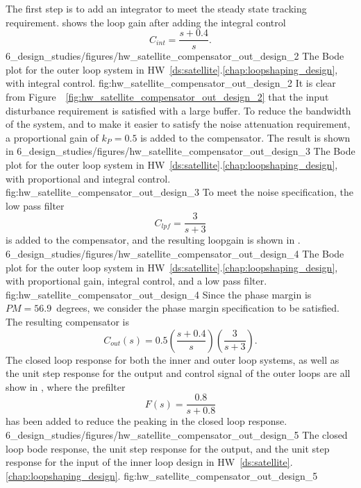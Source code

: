 The first step is to add an integrator to meet the steady state tracking requirement.   shows the loop gain after adding the integral control
\[
C_{int} = \frac{s+0.4}{s}.
\]
	{6_design_studies/figures/hw_satellite_compensator_out_design_2}
   	{The Bode plot for the outer loop system in HW~\ref{ds:satellite}.\ref{chap:loopshaping_design}, with integral control.}
   	{fig:hw_satellite_compensator_out_design_2}
It is clear from Figure~~\ref{fig:hw_satellite_compensator_out_design_2} that the input disturbance requirement is satisfied with a large buffer.  To reduce the bandwidth of the system, and to make it easier to satisfy the noise attenuation requirement, a proportional gain of $k_P=0.5$ is added to the compensator.  The result is shown in 
	{6_design_studies/figures/hw_satellite_compensator_out_design_3}
   	{The Bode plot for the outer loop system in HW~\ref{ds:satellite}.\ref{chap:loopshaping_design}, with proportional and integral control.}
   	{fig:hw_satellite_compensator_out_design_3}
To meet the noise specification, the low pass filter
\[
C_{lpf} = \frac{3}{s+3}
\]
is added to the compensator, and the resulting loopgain is shown in .
	{6_design_studies/figures/hw_satellite_compensator_out_design_4}
   	{The Bode plot for the outer loop system in HW~\ref{ds:satellite}.\ref{chap:loopshaping_design}, with proportional gain, integral control, and a low pass  filter.}
   	{fig:hw_satellite_compensator_out_design_4}
Since the phase margin is $PM=56.9$~degrees, we consider the phase margin specification to be satisfied.
The resulting compensator is
\[
C_{out}(s) = 0.5\left(\frac{s+0.4}{s}\right)\left(\frac{3}{s+3}\right).
\]
The closed loop response for both the inner and outer loop systems, 
as well as the unit step response for the output and control signal of the outer loops are all show in , where the prefilter
\[
F(s) = \frac{0.8}{s+0.8}
\]
has been added to reduce the peaking in the closed loop response.
	{6_design_studies/figures/hw_satellite_compensator_out_design_5}
   	{The closed loop bode response, the unit step response for the output, and the unit step response for the input of the inner loop design in HW~\ref{ds:satellite}.\ref{chap:loopshaping_design}.}
   	{fig:hw_satellite_compensator_out_design_5}


